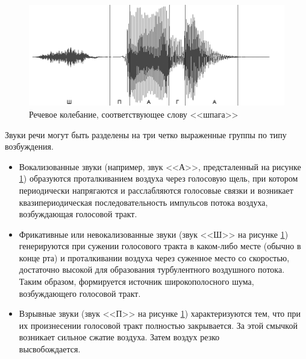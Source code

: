 \documentclass[a4paper,14pt,russian,utf8,nocolumnsxix,nocolumnxxxi,nocolumnxxxii]{eskdtext}
\begin{document}
\begin{figure}[H]	
	\centering
	\includegraphics[width=120mm]{shpaga_graph.png}			
	\caption{Речевое колебание, соответствующее слову <<шпага>>}
	\label{shpaga_graph}
\end{figure}
Звуки речи могут быть разделены на три четко выраженные группы по типу возбуждения.
\begin{itemize}

\item Вокализованные звуки (например, звук <<А>>, предсталенный на рисунке \ref{shpaga_graph}) образуются проталкиванием воздуха через голосовую щель, при котором периодически напрягаются и расслабляются голосовые связки и возникает квазипериодическая последовательность импульсов потока воздуха, возбуждающая голосовой тракт.
\item Фрикативные или невокализованные звуки (звук <<Ш>> на рисунке \ref{shpaga_graph}) генерируются при сужении голосового тракта в каком-либо месте (обычно в конце рта) и проталкивании воздуха через суженное место со скоростью, достаточно высокой для образования турбулентного воздушного потока. Таким образом, формируется источник широкополосного шума, возбуждающего голосовой тракт. 
\item Взрывные звуки (звук <<П>> на рисунке \ref{shpaga_graph}) характеризуются тем, что при их произнесении голосовой тракт полностью закрывается. За этой смычкой возникает сильное сжатие воздуха. Затем воздух резко\\ высвобождается.\cite{rabiner1}
\end{itemize}
\end{document}
